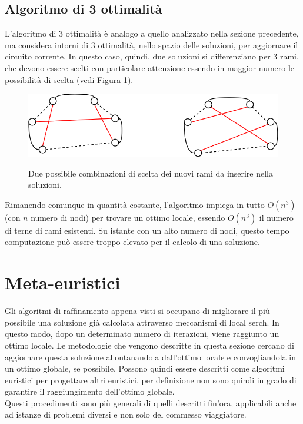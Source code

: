 \subsection{Algoritmo di 3 ottimalità}
L'algoritmo di 3 ottimalità è analogo a quello analizzato nella sezione precedente, ma considera intorni di 3 ottimalità, nello spazio delle soluzioni, per aggiornare il circuito corrente. In questo caso, quindi, due soluzioni si differenziano per 3 rami, che devono essere scelti con particolare attenzione essendo in maggior numero le possibilità di scelta (vedi Figura \ref{three_optimality}).
\begin{figure}[h] 
\begin{center} 
  \includegraphics[scale=0.4]{Images/three_exchange}\\ 
  \caption{\footnotesize{Due possibile combinazioni di scelta dei nuovi rami da inserire nella soluzioni.}}
  \label{three_optimality}
\end{center}
\end{figure}
Rimanendo comunque in quantità costante, l'algoritmo impiega in tutto $O(n^3)$ (con $n$ numero di nodi) per trovare un ottimo locale, essendo $O(n^3)$ il numero di terne di rami esistenti. Su istante con un alto numero di nodi, questo tempo computazione può essere troppo elevato per il calcolo di una soluzione. 
\section{Meta-euristici}
Gli algoritmi di raffinamento appena visti si occupano di migliorare il più possibile una soluzione già calcolata attraverso meccanismi di local serch. In questo modo, dopo un determinato numero di iterazioni, viene raggiunto un ottimo locale. Le metodologie che vengono descritte in questa sezione cercano di aggiornare questa soluzione allontanandola dall'ottimo locale e convogliandola in un ottimo globale, se possibile. Possono quindi essere descritti come algoritmi euristici per progettare altri euristici, per definizione non sono quindi in grado di garantire il raggiungimento dell'ottimo globale.\\
Questi procedimenti sono più generali di quelli descritti fin'ora, applicabili anche ad istanze di problemi diversi e non solo del commesso viaggiatore. 
